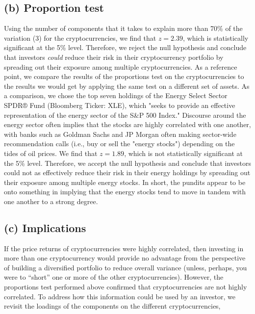 \documentclass[12pt,twoside]{article}
\begin{document}
\subsection*{(b) Proportion test}
Using the number of components that it takes to explain more than 70\% of the variation (3) for the cryptocurrencies, we find that $z=2.39$, which is statistically significant at the 5\% level. Therefore, we reject the null hypothesis and conclude that investors \textit{could} reduce their risk in their cryptocurrency portfolio by spreading out their exposure among multiple cryptocurrencies.
\bigbreak
As a reference point, we compare the results of the proportions test on the cryptocurrencies to the results we would get by applying the same test on a different set of assets. As a comparison, we chose the top seven holdings of the Energy Select Sector SPDR® Fund (Bloomberg Ticker: XLE), which "seeks to provide an effective representation of the energy sector of the S\&P 500 Index."  Discourse around the energy sector often implies that the stocks are highly correlated with one another, with banks such as Goldman Sachs and JP Morgan often making sector-wide recommendation calls (i.e., buy or sell the "energy stocks") depending on the tides of oil prices. We find that $z=1.89$, which is not statistically significant at the 5\% level. Therefore, we accept the null hypothesis and conclude that investors could not as effectively reduce their risk in their energy holdings by spreading out their exposure among multiple energy stocks. In short, the pundits appear to be onto something in implying that the energy stocks tend to move in tandem with one another to a strong degree.

\subsection*{(c) Implications}

If the price returns of cryptocurrencies were highly correlated, then investing in more than one cryptocurrency would provide no advantage from the perspective of building a diversified portfolio to reduce overall variance (unless, perhaps, you were to “short” one or more of the other cryptocurrencies). However, the proportions test performed above confirmed that cryptocurrencies are not highly correlated. To address how this information could be used by an investor, we revisit the loadings of the components on the different cryptocurrencies,
\end{document}
